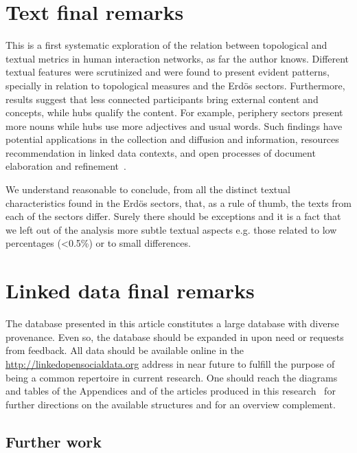 \section{Text final remarks}\label{sec:remarks}
This is a first systematic exploration of the relation between topological and textual
metrics in human interaction networks, as far the author knows.
Different textual features were scrutinized and were found to present
evident patterns, specially in relation to topological measures and the Erd\"os sectors.
Furthermore, results suggest that less connected participants bring external content and concepts,
while hubs qualify the content.
For example, periphery sectors present more nouns while hubs use more adjectives and usual words.
Such findings have potential applications in the collection and diffusion and information,
resources recommendation in linked data contexts,
and open processes of document elaboration and refinement~\cite{ensaio,ops,opa,stab,pnud4,pnud3}.

We understand reasonable to conclude, from all the distinct textual characteristics
found in the Erd\"os sectors, that, as a rule of thumb, the texts from each of the sectors differ.
Surely there should be exceptions and it is a fact that we left out of the analysis
more subtle textual aspects e.g. those related to low percentages (<0.5\%) or to small
differences.

\section{Linked data final remarks}
The database presented in this article
constitutes a large database with diverse provenance.
Even so, the database should be expanded in upon need or requests from feedback.
All data should be available online in the \url{http://linkedopensocialdata.org}
address in near future to fulfill the purpose of being a common
repertoire in current research.
One should reach the diagrams and tables of the 
Appendices and of the articles produced in this research~\cite{stab,rcText,versinus,losd}
for further directions
on the available structures and for an overview complement.


\subsection{Further work}\label{subsec:fw}

